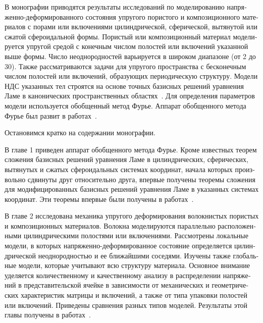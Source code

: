 \begin{russian}
В монографии приводятся результаты исследований по моделированию на\-пря\-же\-н\-но-де\-фор\-ми\-ро\-ва\-н\-но\-го состояния упругого пористого и композиционного материалов с порами или включениями цилиндрической, сферической, вытянутой или сжатой сфероидальной формы. Пористый или композиционный материал моделируется упругой средой с конечным числом полостей или включений указанной выше формы. Число неоднородностей варьируется в широком диапазоне (от 2 до 30). Также рассматриваются задачи для упругого пространства с бесконечным числом полостей или включений, образующих периодическую структуру.
Модели НДС указанных тел строятся на основе точных базисных решений уравнения Ламе в канонических пространственных областях~\cite{Nikolaev1993, Nikolaev1998, Nikolaev1984}. Для определения параметров модели используется обобщенный метод Фурье. Аппарат обобщенного метода Фурье был развит в работах~\cite{Nikolaev1998, Nikolaev2011, Nikolaev1998-1, Nikolaev1993, Nikolaev1984}.

Остановимся кратко на содержании монографии.

В главе 1 приведен аппарат обобщенного метода Фурье. Кроме известных теорем сложения базисных решений уравнения Ламе в цилиндрических, сферических, вытянутых и сжатых сфероидальных системах координат, начала которых произвольно сдвинуты друг относительно друга, впервые получены теоремы сложения для модифицированных базисных решений уравнения Ламе в указанных системах координат. Эти теоремы впервые были получены в работах~\cite{Nikolaev2014-1, Nikolaev2014-9}.

В главе 2 исследована механика упругого деформирования волокнистых пористых и композиционных материалов. Волокна моделируются параллельно расположенными цилиндрическими полостями или включениями. Рассмотрены локальные модели, в которых напряженно-деформированное состояние определяется цилиндрической неоднородностью и ее ближайшими соседями. Изучены также глобальные модели, которые учитывают всю структуру материала. Основное внимание уделяется количественному и качественному анализу в распределении напряжений в представительской ячейке в зависимости от механических и геометрических характеристик матрицы и включений, а также от типа упаковки полостей или включений. Приведены сравнения разных типов моделей. Результаты этой главы получены в работах~\cite{Nikolaev2013-1, Nikolaev2013-2, Nikolaev2013-4, Nikolaev2013-3, Nikolaev2015-1}.
 

\end{russian}
